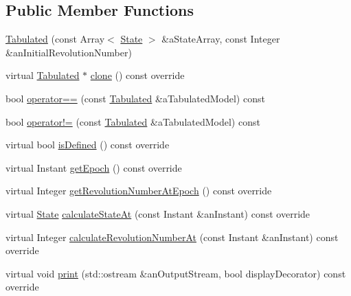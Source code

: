 \subsection*{Public Member Functions}
\begin{DoxyCompactItemize}
\item 
\hyperlink{classostk_1_1astro_1_1trajectory_1_1orbit_1_1models_1_1_tabulated_aee7a0780a163332e41338e7176da97df}{Tabulated} (const Array$<$ \hyperlink{classostk_1_1astro_1_1trajectory_1_1_state}{State} $>$ \&a\+State\+Array, const Integer \&an\+Initial\+Revolution\+Number)
\item 
virtual \hyperlink{classostk_1_1astro_1_1trajectory_1_1orbit_1_1models_1_1_tabulated}{Tabulated} $\ast$ \hyperlink{classostk_1_1astro_1_1trajectory_1_1orbit_1_1models_1_1_tabulated_a53603727c33f9ff8db520831cf666142}{clone} () const override
\item 
bool \hyperlink{classostk_1_1astro_1_1trajectory_1_1orbit_1_1models_1_1_tabulated_a43b91c2c968fe65dee1a64bd3c1cdf3f}{operator==} (const \hyperlink{classostk_1_1astro_1_1trajectory_1_1orbit_1_1models_1_1_tabulated}{Tabulated} \&a\+Tabulated\+Model) const
\item 
bool \hyperlink{classostk_1_1astro_1_1trajectory_1_1orbit_1_1models_1_1_tabulated_ab50e1a3858fa4bedf4577e8d9fc30744}{operator!=} (const \hyperlink{classostk_1_1astro_1_1trajectory_1_1orbit_1_1models_1_1_tabulated}{Tabulated} \&a\+Tabulated\+Model) const
\item 
virtual bool \hyperlink{classostk_1_1astro_1_1trajectory_1_1orbit_1_1models_1_1_tabulated_ad114ba4762b54211f74f0aa3ac5eedae}{is\+Defined} () const override
\item 
virtual Instant \hyperlink{classostk_1_1astro_1_1trajectory_1_1orbit_1_1models_1_1_tabulated_a0e92ebaac60e5113989eaadc66062b75}{get\+Epoch} () const override
\item 
virtual Integer \hyperlink{classostk_1_1astro_1_1trajectory_1_1orbit_1_1models_1_1_tabulated_adbd37f167e43cedcb15358c16d62bae8}{get\+Revolution\+Number\+At\+Epoch} () const override
\item 
virtual \hyperlink{classostk_1_1astro_1_1trajectory_1_1_state}{State} \hyperlink{classostk_1_1astro_1_1trajectory_1_1orbit_1_1models_1_1_tabulated_ad7935cafe71b572b97b9df93e469d2f8}{calculate\+State\+At} (const Instant \&an\+Instant) const override
\item 
virtual Integer \hyperlink{classostk_1_1astro_1_1trajectory_1_1orbit_1_1models_1_1_tabulated_ad7aabd8943ffaa16e569e331bdfa414e}{calculate\+Revolution\+Number\+At} (const Instant \&an\+Instant) const override
\item 
virtual void \hyperlink{classostk_1_1astro_1_1trajectory_1_1orbit_1_1models_1_1_tabulated_a66be3f1f23a464c666c38a3adcc3bab5}{print} (std\+::ostream \&an\+Output\+Stream, bool display\+Decorator) const override
\end{DoxyCompactItemize}
